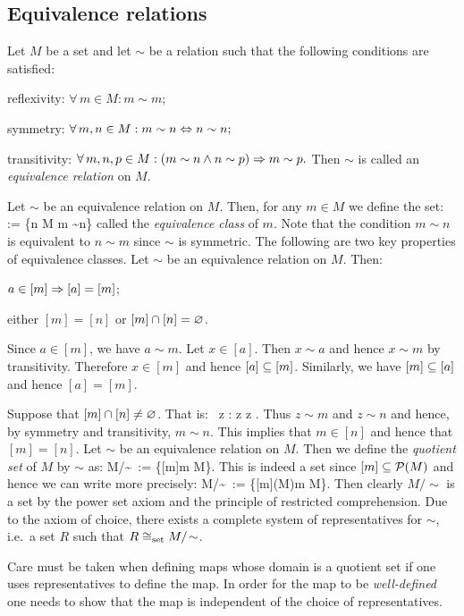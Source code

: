 \subsection{Equivalence relations}

\bd
Let $M$ be a set and let $\sim$ be a relation such that the following conditions are satisfied:
\ben
\item[i)] reflexivity: $\forall \, m \in M: m \sim m;$
\item[ii)] symmetry: $\forall \, m,n \in M: m \sim n \Leftrightarrow n \sim n;$
\item[iii)] transitivity: $\forall \, m,n,p \in M: (m \sim n \land n \sim p) \Rightarrow m \sim p.$
\een
Then $\sim$ is called an \emph{equivalence relation} on $M$.
\ed

\bd
Let $\sim$ be an equivalence relation on $M$. Then, for any $m \in M$ we define the set:
\bse
[m] := \{n \in M \mid m \sim n\}
\ese
called the \emph{equivalence class} of $m$. Note that the condition $m \sim n$ is equivalent to $n \sim m$ since $\sim$ is symmetric.
\ed
The following are two key properties of equivalence classes.
\bp
Let $\sim$ be an equivalence relation on $M$. Then:
\ben
\item[i)] $a \in [m] \Rightarrow [a]=[m]$;
\item[ii)] either $[m]=[n]$ or $[m] \cap [n] = \varnothing$.
\een
\ep

\bq
\ben
\item[i)] Since $a\in[m]$, we have $a\sim m$. Let $x \in [a]$. Then $x \sim a$ and hence $x \sim m$ by transitivity. Therefore $x \in [m]$ and hence $[a]\subseteq[m]$. Similarly, we have $[m]\subseteq[a]$ and hence $[a]=[m]$.
\item[ii)] Suppose that $[m]\cap[n]\neq\varnothing$. That is:
\bse
\exists \, z : z \in [m] \land z \in [n].
\ese
Thus $z \sim m$ and $z \sim n$ and hence, by symmetry and transitivity, $m \sim n$. This implies that $m \in [n]$ and hence that $[m] = [n]$. \qedhere
\een
\eq
\bd
Let $\sim$ be an equivalence relation on $M$. Then we define the \emph{quotient set} of $M$ by $\sim$ as:
\bse
M/\!\sim\ := \{[m]\mid m \in M\}.
\ese
This is indeed a set since $[m]\subseteq\mathcal{P}(M)$ and hence we can write more precisely:
\bse
M/\!\sim\ := \{[m]\in\cP(M)\mid m \in M\}.
\ese
Then clearly $M/\!\sim$ is a set by the power set axiom and the principle of restricted comprehension.
\ed
\br
Due to the axiom of choice, there exists a complete system of representatives for $\sim$, i.e.\ a set $R$ such that $R \cong_\mathrm{set} M/\!\sim$.
\er

\br
Care must be taken when defining maps whose domain is a quotient set if one uses representatives to define the map. In order for the map to be \emph{well-defined} one needs to show that the map is independent of the choice of representatives. 
\er

